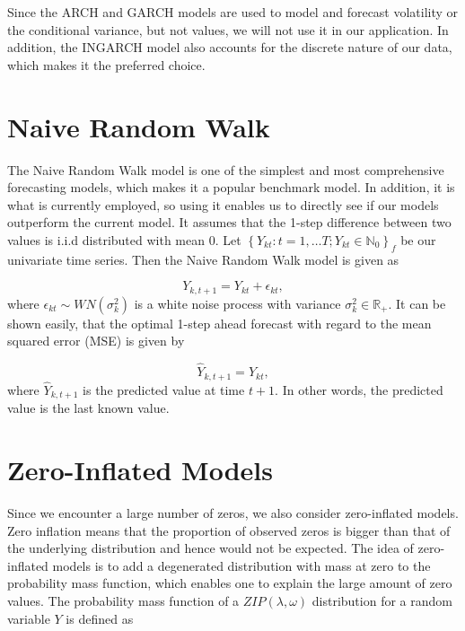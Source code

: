 Since the ARCH and GARCH models are used to model and forecast volatility or the conditional variance, but not values, we will not use it in our application. In addition, the INGARCH model also accounts for the discrete nature of our data, which makes it the preferred choice. 


\section{Naive Random Walk}
\label{sec: Naive Random Walk}

The Naive Random Walk model is one of the simplest and most comprehensive forecasting models, which makes it a popular benchmark model. In addition, it is what is currently employed, so using it enables us to directly see if our models outperform the current model. It assumes that the 1-step difference between two values is i.i.d distributed with mean 0. Let $\left\{Y_{kt}:t=1,\ldots T; Y_{kt} \in \mathbb{N}_0\right\}_f$ be our univariate time series. Then the Naive Random Walk model is given as

\begin{equation}
Y_{k,t+1}= Y_{kt} + \epsilon_{kt}, 
\label{eq: Random Walk Model}
\end{equation}
where $\epsilon_{kt} \sim WN(\sigma_k^2)$ is a white noise process with variance $\sigma_k^2 \in \mathbb{R}_+$. It can be shown easily, that the optimal 1-step ahead forecast with regard to the mean squared error (MSE) is given by

\begin{equation}
\hat{Y}_{k,t+1}= Y_{kt},
\label{eq: Random Walk Model Prediction}
\end{equation}
%
where $\hat{Y}_{k,t+1}$ is the predicted value at time $t+1$. In other words, the predicted value is the last known value.  


\section{Zero-Inflated Models}
\label{sec: Zim}

Since we encounter a large number of zeros, we also consider zero-inflated models. Zero inflation means that the proportion of observed zeros is bigger than that of the underlying distribution and hence would not be expected. The idea of zero-inflated models is to add a degenerated distribution with mass at zero to the probability mass function, which enables one to explain the large amount of zero values. The probability mass function of a $ZIP(\lambda,\omega)$ distribution for a random variable $Y$ is defined as \textcite{Zhu:2012}

